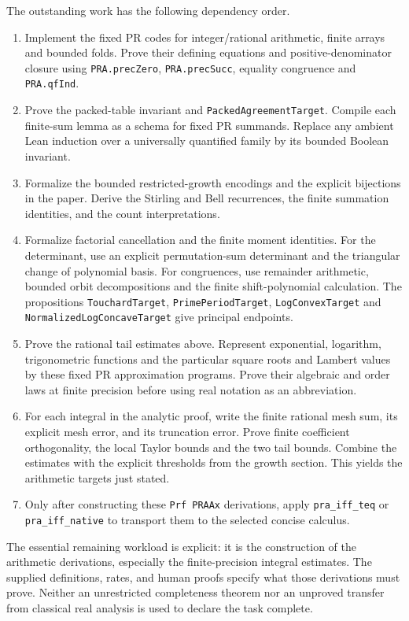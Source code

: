 The outstanding work has the following dependency order.
\begin{enumerate}
\item Implement the fixed PR codes for integer/rational arithmetic,
finite arrays and bounded folds. Prove their defining equations and
positive-denominator closure using \texttt{PRA.precZero},
\texttt{PRA.precSucc}, equality congruence and \texttt{PRA.qfInd}.
\item Prove the packed-table invariant and
\texttt{PackedAgreementTarget}. Compile each finite-sum lemma as a schema
for fixed PR summands. Replace any ambient Lean induction over a
universally quantified family by its bounded Boolean invariant.
\item Formalize the bounded restricted-growth encodings and the explicit
bijections in the paper. Derive the Stirling and Bell recurrences, the
finite summation identities, and the count interpretations.
\item Formalize factorial cancellation and the finite moment identities.
For the determinant, use an explicit permutation-sum determinant and the
triangular change of polynomial basis. For congruences, use remainder
arithmetic, bounded orbit decompositions and the finite shift-polynomial
calculation. The propositions \texttt{TouchardTarget},
\texttt{PrimePeriodTarget}, \texttt{LogConvexTarget} and
\texttt{NormalizedLogConcaveTarget} give principal endpoints.
\item Prove the rational tail estimates above. Represent exponential,
logarithm, trigonometric functions and the particular square roots and
Lambert values by these fixed PR approximation programs. Prove their
algebraic and order laws at finite precision before using real notation
as an abbreviation.
\item For each integral in the analytic proof, write the finite rational
mesh sum, its explicit mesh error, and its truncation error. Prove finite
coefficient orthogonality, the local Taylor bounds and the two tail
bounds. Combine the estimates with the explicit thresholds from the
growth section. This yields the arithmetic targets just stated.
\item Only after constructing these \texttt{Prf PRAAx} derivations, apply
\texttt{pra\_iff\_teq} or \texttt{pra\_iff\_native} to transport them to
the selected concise calculus.
\end{enumerate}

The essential remaining workload is explicit: it is the construction of
the arithmetic derivations, especially the finite-precision integral
estimates. The supplied definitions, rates, and human proofs specify what
those derivations must prove. Neither an unrestricted completeness theorem
nor an unproved transfer from classical real analysis is used to declare
the task complete.
